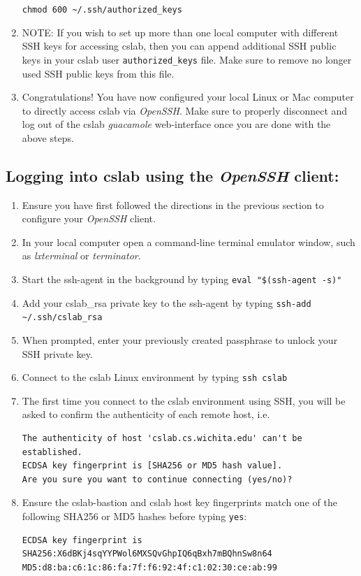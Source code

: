 \documentclass[12pt]{article}
\begin{document}
\begin{flushleft}
\begin{enumerate}
    \verb|chmod 600 ~/.ssh/authorized_keys|
  \item NOTE: If you wish to set up more than one local computer with different SSH keys for accessing cslab, then you can append additional SSH public keys in your cslab user \verb|authorized_keys| file. Make sure to remove no longer used SSH public keys from this file.
  \item Congratulations! You have now configured your local Linux or Mac computer to directly access cslab via \textit{OpenSSH}. Make sure to properly disconnect and log out of the cslab \textit{guacamole} web-interface once you are done with the above steps.
\end{enumerate}

\newpage
\subsection*{Logging into cslab using the \textit{OpenSSH} client:}
\begin{enumerate}
  \item Ensure you have first followed the directions in the previous section to configure your \textit{OpenSSH} client.
  \item In your local computer open a command-line terminal emulator window, such as \textit{lxterminal} or \textit{terminator}.
  \item Start the ssh-agent in the background by typing\break
    \verb|eval "$(ssh-agent -s)"|
  \item Add your cslab\_rsa private key to the ssh-agent by typing \break
    \verb|ssh-add ~/.ssh/cslab_rsa|
  \item When prompted, enter your previously created passphrase to unlock your SSH private key.
  \item Connect to the cslab Linux environment by typing \break
    \verb|ssh cslab|
  \item The first time you connect to the cslab environment using SSH, you will be asked to confirm the authenticity of each remote host, i.e.
\begin{verbatim}
The authenticity of host 'cslab.cs.wichita.edu' can't be established.
ECDSA key fingerprint is [SHA256 or MD5 hash value].
Are you sure you want to continue connecting (yes/no)?
\end{verbatim}

  \item Ensure the cslab-bastion and cslab host key fingerprints match one of the following SHA256 or MD5 hashes before typing \texttt{yes}:
\begin{verbatim}
ECDSA key fingerprint is
SHA256:X6dBKj4sqYYPWol6MXSQvGhpIQ6qBxh7mBQhnSw8n64
MD5:d8:ba:c6:1c:86:fa:7f:f6:92:4f:c1:02:30:ce:ab:99


\end{verbatim}
\end{enumerate}
\end{flushleft}
\end{document}
